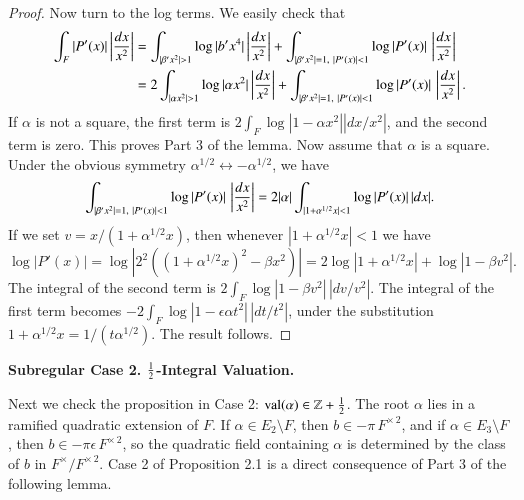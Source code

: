 \documentclass{amsart}
\newcommand\leftd[1]{\left | {d#1\over #1^2}\right |}
\newcommand\leftdx{\leftd x}
\newcommand\val{\operatorname{val}}
\begin{document}
\begin{proof}
Now turn to the log terms.  We easily check that 
\begin{align*}
\int_{F} |P'(x)|\leftdx &= \int_{|\beta'x^2|>1} \log|b'x^4|\leftdx
        + \int_{|\beta'x^2|=1,\ |P'(x)|<1} \log|P'(x)|\, \leftdx\\
 &= 2\int_{|\alpha x^2| >1} \log|\alpha x^2| \leftdx 
        + \int_{|\beta'x^2|=1,\ |P'(x)|<1} \log|P'(x)|\, \leftdx.
\end{align*}
If $\alpha$ is not a square, the first term is 
$2\int_{F} \log|1-\alpha x^2| |dx/x^2|$, and the second term is
zero.  This proves Part 3 of the lemma.  Now assume that $\alpha$ is
a square.  Under the obvious symmetry $\alpha^{1/2} \leftrightarrow
-\alpha^{1/2}$, we have
$$\int_{|\beta'x^2|=1,\   |P'(x)|<1} \log|P'(x)|\,\leftdx =
   2|\alpha|\int_{|1+\alpha^{1/2} x|<1} \log|P'(x)| \,|dx|.$$
If we set $v=x/(1+\alpha^{1/2} x)$, then
whenever $|1+\alpha^{1/2}x|<1$ we have
$$\log|P'(x)| = \log|2^2 ((1+\alpha^{1/2} x)^2 - \beta x^2)| = 
2\log|1+\alpha^{1/2}x| + \log|1-\beta v^2|.$$
The integral of the second term is $2\int_{F}\log|1-\beta v^2| \,|dv/v^2|$.
The integral of the first term becomes
$-2\int_{F} \log |1-\epsilon \alpha t^2| \,|dt/t^2|$, under the
substitution $1+\alpha^{1/2} x = 1/(t \alpha^{1/2})$.  The result
follows.
\end{proof}

\bigskip
\centerline{\bf Subregular Case 2.  ${1\over 2}$-Integral Valuation.}
\bigskip

Next we check the proposition in Case 2: $\val(\alpha)\in {\mathbb Z}+{1\over 2}$.
The root
$\alpha$ lies in a ramified quadratic extension of $F$.  
If $\alpha\in E_2\setminus F$, then $b\in -\pi \,F^{\times\,2}$,
and if $\alpha\in E_3\setminus F$, then $b\in -\pi\epsilon\,F^{\times\,2}$,
so the quadratic field containing $\alpha$ is determined by the
class of $b$ in $F^\times/F^{\times\,2}$.
Case 2 of Proposition 2.1 is a direct consequence of Part 3 of
the following lemma.
\end{document}
